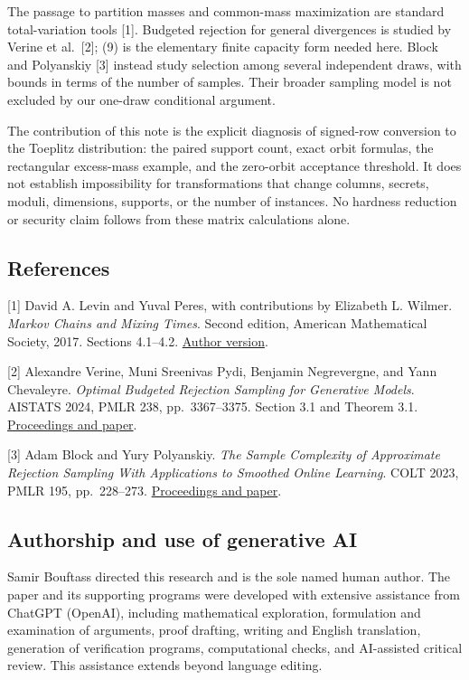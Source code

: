 \documentclass[
]{article}
\begin{document}
The passage to partition masses and common-mass maximization are
standard total-variation tools {[}1{]}. Budgeted rejection for general
divergences is studied by Verine et al.~{[}2{]}; (9) is the elementary
finite capacity form needed here. Block and Polyanskiy {[}3{]} instead
study selection among several independent draws, with bounds in terms of
the number of samples. Their broader sampling model is not excluded by
our one-draw conditional argument.

The contribution of this note is the explicit diagnosis of signed-row
conversion to the Toeplitz distribution: the paired support count, exact
orbit formulas, the rectangular excess-mass example, and the zero-orbit
acceptance threshold. It does not establish impossibility for
transformations that change columns, secrets, moduli, dimensions,
supports, or the number of instances. No hardness reduction or security
claim follows from these matrix calculations alone.

\subsection{References}\label{references}

{[}1{]} David A. Levin and Yuval Peres, with contributions by Elizabeth
L. Wilmer. \emph{Markov Chains and Mixing Times}. Second edition,
American Mathematical Society, 2017. Sections 4.1--4.2.
\href{https://pages.uoregon.edu/dlevin/MARKOV/markovmixing.pdf}{Author
version}.

{[}2{]} Alexandre Verine, Muni Sreenivas Pydi, Benjamin Negrevergne, and
Yann Chevaleyre. \emph{Optimal Budgeted Rejection Sampling for
Generative Models}. AISTATS 2024, PMLR 238, pp.~3367--3375. Section 3.1
and Theorem 3.1.
\href{https://proceedings.mlr.press/v238/verine24a.html}{Proceedings and
paper}.

{[}3{]} Adam Block and Yury Polyanskiy. \emph{The Sample Complexity of
Approximate Rejection Sampling With Applications to Smoothed Online
Learning}. COLT 2023, PMLR 195, pp.~228--273.
\href{https://proceedings.mlr.press/v195/block23a.html}{Proceedings and
paper}.

\subsection{Authorship and use of generative
AI}\label{authorship-and-use-of-generative-ai}

Samir Bouftass directed this research and is the sole named human
author. The paper and its supporting programs were developed with
extensive assistance from ChatGPT (OpenAI), including mathematical
exploration, formulation and examination of arguments, proof drafting,
writing and English translation, generation of verification programs,
computational checks, and AI-assisted critical review. This assistance
extends beyond language editing.
\end{document}
